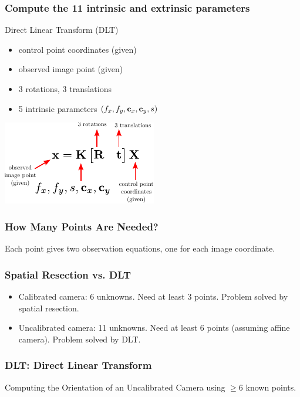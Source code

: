 \begin{frame}
  \frametitle{Compute the 11 intrinsic and extrinsic parameters}
  Direct Linear Transform (DLT)
  \begin{itemize}
    \item control point coordinates (given)
    \item observed image point  (given)
    \item 3 rotations, 3 translations
    \item 5 intrinsic parameters $(f_{x}, f_{y}, \boldsymbol{\mathbf{c}}_{x}, \boldsymbol{\mathbf{c}}_{y}, s)$
  \end{itemize}

  \begin{center}
    \includegraphics[width=0.5\columnwidth]{./images/projection_matrix_unknowns.pdf}
  \end{center}
\end{frame}

\begin{frame}
  \frametitle{How Many Points Are Needed?}
  Each point gives two observation equations, one for each image coordinate.
\end{frame}

\begin{frame}
  \frametitle{Spatial Resection vs. DLT}
  \begin{itemize}
    \item Calibrated camera: 6 unknowns. Need at least 3 points. Problem solved by spatial resection.
    \item Uncalibrated camera: 11 unknowns. Need at least 6 points (assuming affine camera). Problem solved by DLT.
  \end{itemize}
\end{frame}

\begin{frame}
  \frametitle{DLT: Direct Linear Transform}
  Computing the Orientation of an Uncalibrated Camera using $\ge 6$ known points.
\end{frame}

